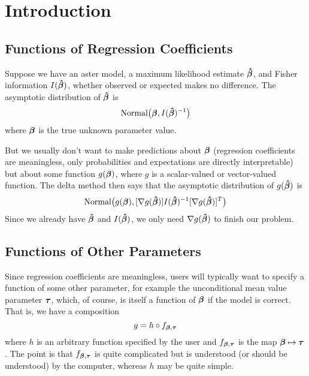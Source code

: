 
\section{Introduction}

\subsection{Functions of Regression Coefficients}

Suppose we have an aster model, a maximum likelihood estimate
${\boldsymbol{\hat{\beta}}}$, and Fisher information $I({\boldsymbol{\hat{\beta}}})$,
whether observed or expected makes no difference.  The asymptotic
distribution of ${\boldsymbol{\hat{\beta}}}$ is
$$
   \text{Normal}\bigl({\boldsymbol{\beta}}, I({\boldsymbol{\hat{\beta}}})^{-1} \bigr)
$$
where ${\boldsymbol{\beta}}$ is the true unknown parameter value.

But we usually don't want to make predictions about ${\boldsymbol{\beta}}$
(regression coefficients are meaningless, only probabilities and expectations
are directly interpretable) but about some function
$g({\boldsymbol{\beta}})$, where $g$ is a scalar-valued or vector-valued function.
The delta method then says that the asymptotic distribution of
$g({\boldsymbol{\hat{\beta}}})$ is
$$
   \text{Normal}\bigl(g({\boldsymbol{\beta}}),
   [\nabla g({\boldsymbol{\hat{\beta}}})] I({\boldsymbol{\hat{\beta}}})^{-1} [\nabla g({\boldsymbol{\hat{\beta}}})]^T
   \bigr)
$$
Since we already have ${\boldsymbol{\hat{\beta}}}$ and $I({\boldsymbol{\hat{\beta}}})$,
we only need $\nabla g({\boldsymbol{\hat{\beta}}})$ to finish our problem.

\subsection{Functions of Other Parameters}

Since regression coefficients are meaningless, users will typically
want to specify a function of some other parameter, for example the
unconditional mean value parameter ${\boldsymbol{\tau}}$, which, of course,
is itself a function of ${\boldsymbol{\beta}}$ if the model
is correct.  That is, we have a composition
$$
   g = h \circ f_{{\boldsymbol{\beta}}, {\boldsymbol{\tau}}}
$$
where $h$ is an arbitrary function specified by the user
and $f_{{\boldsymbol{\beta}}, {\boldsymbol{\tau}}}$ is the map ${\boldsymbol{\beta}} \mapsto {\boldsymbol{\tau}}$.
The point is that $f_{{\boldsymbol{\beta}}, {\boldsymbol{\tau}}}$ is quite complicated
but is understood (or should be understood) by the computer,
whereas $h$ may be quite simple.


